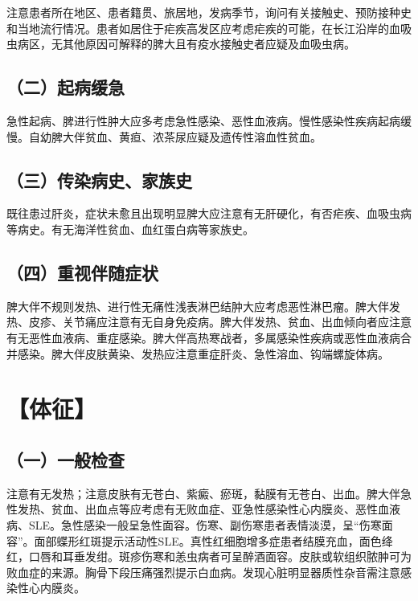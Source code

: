 注意患者所在地区、患者籍贯、旅居地，发病季节，询问有关接触史、预防接种史和当地流行情况。患者如居住于疟疾高发区应考虑疟疾的可能，在长江沿岸的血吸虫病区，无其他原因可解释的脾大且有疫水接触史者应疑及血吸虫病。

\subsection{（二）起病缓急}

急性起病、脾进行性肿大应多考虑急性感染、恶性血液病。慢性感染性疾病起病缓慢。自幼脾大伴贫血、黄疸、浓茶尿应疑及遗传性溶血性贫血。

\subsection{（三）传染病史、家族史}

既往患过肝炎，症状未愈且出现明显脾大应注意有无肝硬化，有否疟疾、血吸虫病等病史。有无海洋性贫血、血红蛋白病等家族史。

\subsection{（四）重视伴随症状}

脾大伴不规则发热、进行性无痛性浅表淋巴结肿大应考虑恶性淋巴瘤。脾大伴发热、皮疹、关节痛应注意有无自身免疫病。脾大伴发热、贫血、出血倾向者应注意有无恶性血液病、重症感染。脾大伴高热寒战者，多属感染性疾病或恶性血液病合并感染。脾大伴皮肤黄染、发热应注意重症肝炎、急性溶血、钩端螺旋体病。

\section{【体征】}

\subsection{（一）一般检查}

注意有无发热；注意皮肤有无苍白、紫癜、瘀斑，黏膜有无苍白、出血。脾大伴急性发热、贫血、出血点等应考虑有无败血症、亚急性感染性心内膜炎、恶性血液病、SLE。急性感染一般呈急性面容。伤寒、副伤寒患者表情淡漠，呈“伤寒面容”。面部蝶形红斑提示活动性SLE。真性红细胞增多症患者结膜充血，面色绛红，口唇和耳垂发绀。斑疹伤寒和恙虫病者可呈醉酒面容。皮肤或软组织脓肿可为败血症的来源。胸骨下段压痛强烈提示白血病。发现心脏明显器质性杂音需注意感染性心内膜炎。

